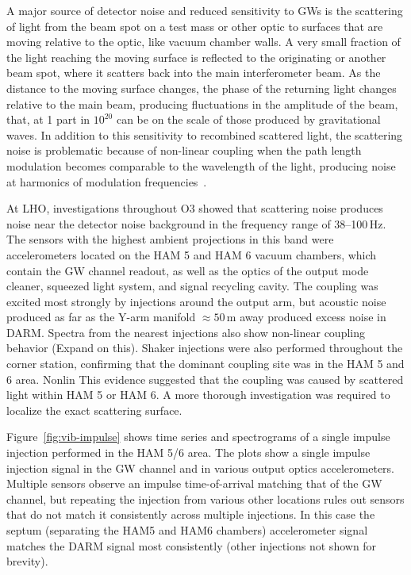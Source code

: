 A major source of detector noise and reduced sensitivity to \acp{GW} is the scattering of light from the beam spot on a test mass or other optic to surfaces that are moving relative to the optic, like vacuum chamber walls.
A very small fraction of the light reaching the moving surface is reflected to the originating or another beam spot, where it scatters back into the main interferometer beam.
As the distance to the moving surface changes, the phase of the returning light changes relative to the main beam, producing fluctuations in the amplitude of the beam, that, at 1 part in $10^{20}$ can be on the scale of those produced by gravitational waves.
In addition to this sensitivity to recombined scattered light, the scattering noise is problematic because of non-linear coupling when the path length modulation becomes comparable to the wavelength of the light, producing noise at harmonics of modulation frequencies~\citep{Soni_2020}.

At \ac{LHO}, investigations throughout \ac{O3} showed that scattering noise produces noise near the detector noise background in the frequency range of 38--100\,Hz.
The sensors with the highest ambient projections in this band were accelerometers located on the HAM 5 and HAM 6 vacuum chambers, which contain the \ac{GW} channel readout, as well as the optics of the output mode cleaner, squeezed light system, and signal recycling cavity.
The coupling was excited most strongly by injections around the output arm, but acoustic noise produced as far as the Y-arm manifold $\approx 50$\,m away produced excess noise in \ac{DARM}.
Spectra from the nearest injections also show non-linear coupling behavior ({\color{red}Expand on this}).
Shaker injections were also performed throughout the corner station, confirming that the dominant coupling site was in the HAM 5 and 6 area.
Nonlin
This evidence suggested that the coupling was caused by scattered light within HAM 5 or HAM 6.
A more thorough investigation was required to localize the exact scattering surface.

Figure~\ref{fig:vib-impulse} shows time series and spectrograms of a single impulse injection performed in the \ac{HAM} 5/6 area.
The plots show a single impulse injection signal in the \ac{GW} channel and in various output optics accelerometers.
Multiple sensors observe an impulse time-of-arrival matching that of the \ac{GW} channel, but repeating the injection from various other locations rules out sensors that do not match it consistently across multiple injections.
In this case the septum (separating the HAM5 and HAM6 chambers) accelerometer signal matches the \ac{DARM} signal most consistently (other injections not shown for brevity).

